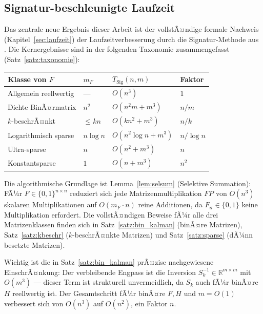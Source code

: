 ﻿\documentclass[a4paper,12pt]{article}
\theoremstyle{definition}
\begin{document}
\subsection{Signatur-beschleunigte Laufzeit}

Das zentrale neue Ergebnis dieser Arbeit ist der vollstÃ¤ndige formale Nachweis
(Kapitel~\ref{sec:laufzeit}) der Laufzeitverbesserung durch die Signatur-Methode
aus \cite{epp2026boolmm}. Die Kernergebnisse sind in der folgenden Taxonomie zusammengefasst
(Satz~\ref{satz:taxonomie}):

\begin{center}
\begin{tabular}{llll}
\toprule
\textbf{Klasse von $F$} & \textbf{$m_F$} & \textbf{$T_{\mathrm{Sig}}(n,m)$} & \textbf{Faktor} \\
\midrule
Allgemein reellwertig   & ---        & $O(n^3)$             & $1$ \\
Dichte BinÃ¤rmatrix      & $n^2$      & $O(n^2 m + m^3)$     & $n/m$ \\
$k$-beschrÃ¤nkt          & $\leq kn$  & $O(k n^2 + m^3)$     & $n/k$ \\
Logarithmisch sparse    & $n\log n$  & $O(n^2\log n + m^3)$ & $n/\log n$ \\
Ultra-sparse            & $n$        & $O(n^2 + m^3)$       & $n$ \\
Konstantsparse          & $1$        & $O(n + m^3)$         & $n^2$ \\
\bottomrule
\end{tabular}
\end{center}

Die algorithmische Grundlage ist Lemma~\ref{lem:selsum} (Selektive Summation):
FÃ¼r $F \in \{0,1\}^{n\times n}$ reduziert sich jede Matrizenmultiplikation
$FP$ von $O(n^3)$ skalaren Multiplikationen auf $O(m_F \cdot n)$ reine Additionen,
da $F_{il} \in \{0,1\}$ keine Multiplikation erfordert. Die vollstÃ¤ndigen Beweise
fÃ¼r alle drei Matrizenklassen finden sich in Satz~\ref{satz:bin_kalman}
(binÃ¤re Matrizen), Satz~\ref{satz:kbeschr} ($k$-beschrÃ¤nkte Matrizen) und
Satz~\ref{satz:sparse} (dÃ¼nn besetzte Matrizen).

Wichtig ist die in Satz~\ref{satz:bin_kalman} prÃ¤zise nachgewiesene EinschrÃ¤nkung:
Der verbleibende Engpass ist die Inversion $S_k^{-1} \in \mathbb{R}^{m\times m}$
mit $O(m^3)$ --- dieser Term ist strukturell unvermeidlich, da $S_k$ auch fÃ¼r
binÃ¤re $H$ reellwertig ist. Der Gesamtschritt fÃ¼r binÃ¤re $F, H$ und $m = O(1)$
verbessert sich von $O(n^3)$ auf $O(n^2)$, ein Faktor $n$.
\end{document}
